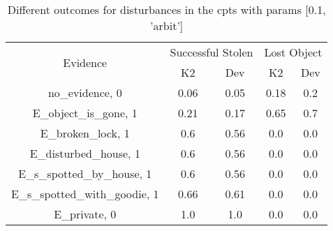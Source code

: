 \begin{table}\begin{tabular}{c|cc|cc}\toprule\multirow{2}{*}{Evidence} & \multicolumn{2}{c}{Successful Stolen} & \multicolumn{2}{c}{Lost Object} \\& {K2} & {Dev} & {K2} & {Dev} \\\midrule
no\_evidence, 0 & \cellcolor{Bittersweet}0.06&\cellcolor{Bittersweet}0.05&\cellcolor{Bittersweet}0.18&\cellcolor{Bittersweet}0.2\\E\_object\_is\_gone, 1 & \cellcolor{Bittersweet}0.21&\cellcolor{Bittersweet}0.17&\cellcolor{Bittersweet}0.65&\cellcolor{Bittersweet}0.7\\E\_broken\_lock, 1 & \cellcolor{Bittersweet}0.6&\cellcolor{Bittersweet}0.56&0.0&0.0\\E\_disturbed\_house, 1 & \cellcolor{Bittersweet}0.6&\cellcolor{Bittersweet}0.56&0.0&0.0\\E\_s\_spotted\_by\_house, 1 & \cellcolor{Bittersweet}0.6&\cellcolor{Bittersweet}0.56&0.0&0.0\\E\_s\_spotted\_with\_goodie, 1 & \cellcolor{Bittersweet}0.66&\cellcolor{Bittersweet}0.61&0.0&0.0\\E\_private, 0 & 1.0&1.0&0.0&0.0\\\bottomrule\end{tabular}\caption{Different outcomes for disturbances in the cpts with params [0.1, 'arbit']}\end{table}